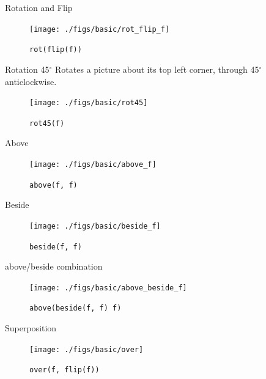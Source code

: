 \documentclass{beamer}
\begin{document}
    \begin{frame}{Rotation and Flip}
        
        \begin{figure}
            \centering
            \texttt{[image: ./figs/basic/rot\_flip\_f]}
            \caption{\texttt{rot(flip(f))}}
            \label{fig:rot_flip_f}
        \end{figure}
    \end{frame}

    \begin{frame}{Rotation 45$^{\circ}$}
    	Rotates a picture about its top left corner, through 45$^{\circ}$ anticlockwise.
	
        \begin{figure}
            \centering
            \texttt{[image: ./figs/basic/rot45]}
            \caption{\texttt{rot45(f)}}
            \label{fig:rot45}
        \end{figure}
    \end{frame}

    \begin{frame}{Above}
        \begin{figure}
            \centering
            \texttt{[image: ./figs/basic/above\_f]}
            \caption{\texttt{above(f, f)}}
            \label{fig:above}
        \end{figure}
    \end{frame}

    \begin{frame}{Beside}
        \begin{figure}
            \centering
            \texttt{[image: ./figs/basic/beside\_f]}
            \caption{\texttt{beside(f, f)}}
            \label{fig:beside}
        \end{figure}
    \end{frame}

    \begin{frame}{above/beside combination}
        \begin{figure}
            \centering
            \texttt{[image: ./figs/basic/above\_beside\_f]}
            \caption{\texttt{above(beside(f, f) f)}}
            \label{fig:above_beside_f}
        \end{figure}
    \end{frame}

    \begin{frame}{Superposition}
        \begin{figure}
            \centering
            \texttt{[image: ./figs/basic/over]}
            \caption{\texttt{over(f, flip(f))}}
            \label{fig:over_f}
        \end{figure}
    \end{frame}
\end{document}
